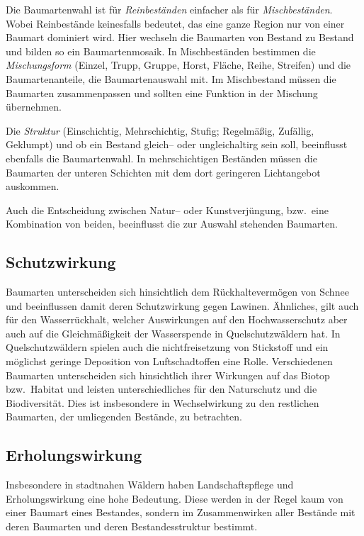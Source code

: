 \documentclass[twocolumn]{scrartcl}
\begin{document}
Die Baumartenwahl ist für \emph{Reinbeständen} einfacher als für
\emph{Mischbeständen}. Wobei Reinbestände keinesfalls bedeutet, das eine ganze
Region nur von einer Baumart dominiert wird. Hier wechseln die Baumarten von
Bestand zu Bestand und bilden so ein Baumartenmosaik. In Mischbeständen
bestimmen die \emph{Mischungsform} (Einzel, Trupp, Gruppe, Horst, Fläche, Reihe,
Streifen) und die Baumartenanteile, die Baumartenauswahl mit. Im Mischbestand
müssen die Baumarten zusammenpassen und sollten eine Funktion in der Mischung
übernehmen.

Die \emph{Struktur} (Einschichtig, Mehrschichtig, Stufig; Regelmäßig,
Zufällig, Geklumpt) und ob ein Bestand gleich-- oder ungleichaltirg
sein soll, beeinflusst ebenfalls die Baumartenwahl. In mehrschichtigen
Beständen müssen die Baumarten der unteren Schichten mit dem dort
geringeren Lichtangebot auskommen.

Auch die Entscheidung zwischen Natur-- oder Kunstverjüngung, bzw.\
eine Kombination von beiden, beeinflusst die zur Auswahl stehenden
Baumarten.

\subsection{Schutzwirkung}
\label{ssec:schutz}

Baumarten unterscheiden sich hinsichtlich dem Rückhaltevermögen von
Schnee und beeinflussen damit deren Schutzwirkung gegen
Lawinen. Ähnliches, gilt auch für den Wasserrückhalt, welcher
Auswirkungen auf den Hochwasserschutz aber auch auf die
Gleichmäßigkeit der Wasserspende in Quelschutzwäldern hat. In
Quelschutzwäldern spielen auch die nichtfreisetzung von Stickstoff und
ein möglichst geringe Deposition von Luftschadtoffen eine Rolle.
Verschiedenen Baumarten unterscheiden sich hinsichtlich ihrer
Wirkungen auf das Biotop bzw.\ Habitat und leisten unterschiedliches
für den Naturschutz und die Biodiversität. Dies ist insbesondere in
Wechselwirkung zu den restlichen Baumarten, der umliegenden Bestände,
zu betrachten.

\subsection{Erholungswirkung}
\label{ssec:erholung}

Insbesondere in stadtnahen Wäldern haben Landschaftspflege und
Erholungswirkung eine hohe Bedeutung. Diese werden in der Regel kaum von
einer Baumart eines Bestandes, sondern im Zusammenwirken aller Bestände
mit deren Baumarten und deren Bestandesstruktur bestimmt.
\end{document}
